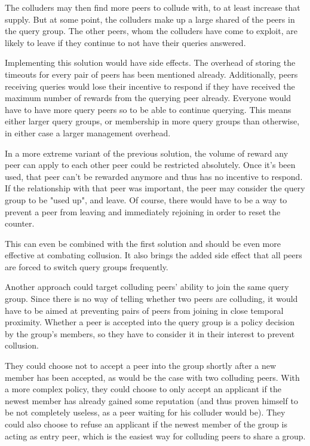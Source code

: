 The colluders may then find more peers to collude with, to at least increase
that supply. But at some point, the colluders make up a large shared of the
peers in the query group. The other peers, whom the colluders have come to
exploit, are likely to leave if they continue to not have their queries
answered.

Implementing this solution would have side effects. The overhead of storing the
timeouts for every pair of peers has been mentioned already. Additionally, peers
receiving queries would lose their incentive to respond if they have received
the maximum number of rewards from the querying peer already. Everyone would
have to have more query peers so to be able to continue querying. This means
either larger query groups, or membership in more query groups than otherwise,
in either case a larger management overhead.

In a more extreme variant of the previous solution, the volume of reward any
peer can apply to each other peer could be restricted absolutely. Once it's been
used, that peer can't be rewarded anymore and thus has no incentive to respond.
If the relationship with that peer was important, the peer may consider the
query group to be "used up", and leave. Of course, there would have to be a way
to prevent a peer from leaving and immediately rejoining in order to reset the
counter.

This can even be combined with the first solution and should be even more
effective at combating collusion. It also brings the added side effect that all
peers are forced to switch query groups frequently.

Another approach could target colluding peers' ability to join the same query
group. Since there is no way of telling whether two peers are colluding, it
would have to be aimed at preventing pairs of peers from joining in close
temporal proximity. Whether a peer is accepted into the query group is a policy
decision by the group's members, so they have to consider it in their interest
to prevent collusion.

They could choose not to accept a peer into the group shortly after a new member
has been accepted, as would be the case with two colluding peers. With a more
complex policy, they could choose to only accept an applicant if the newest
member has already gained some reputation (and thus proven himself to be not
completely useless, as a peer waiting for his colluder would be). They could
also choose to refuse an applicant if the newest member of the group is acting
as entry peer, which is the easiest way for colluding peers to share a group.

